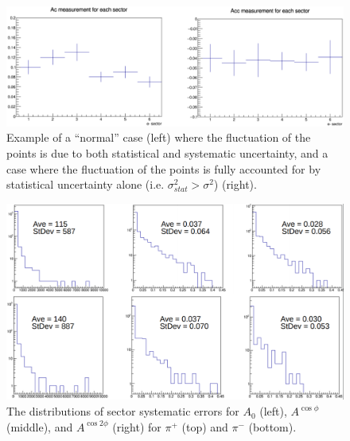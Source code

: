 \begin{figure}[htp]
\centering
\includegraphics[width=6in]{figures/normalAndException_sectorSystematics.png}
\caption{Example of a ``normal'' case (left) where the fluctuation of the points is due to both statistical and systematic uncertainty, and a case where the fluctuation of the points is fully accounted for by statistical uncertainty alone (i.e. $\sigma^2_{stat} > \sigma^2$) (right).}
\label{fig:normalAndException_sectorSystematics}
\end{figure}
%
\begin{figure}[htp]
\centering
\includegraphics[width=6in]{figures/distributionOfSectorSystematics.png}
\caption{The distributions of sector systematic errors for $A_0$ (left), $A^{\cos\phi}$ (middle), and $A^{\cos 2\phi}$ (right) for $\pi^+$ (top) and $\pi^-$ (bottom).}
\label{fig:distributionOfSectorSystematics}
\end{figure}

